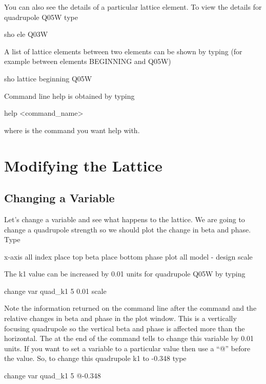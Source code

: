 You can also see the details of a particular lattice element. To view the details
for quadrupole Q05W type
\begin{example}
  sho ele Q03W
\end{example}

A list of lattice elements between two elements can be shown by typing (for
example between elements BEGINNING and Q05W)
\begin{example}
  sho lattice beginning Q05W
\end{example}

Command line help is obtained by typing
\begin{example}
  help <command\_name>
\end{example}
where  is the command you want help with.

\section{Modifying the Lattice}
\label{s:modify_lattice}

\subsection{Changing a Variable}
\label{ss:put_it_back}

Let's change a variable and see what happens to the lattice. We are going to
change a quadrupole strength so we should plot the change in beta and phase.
Type
\begin{example}
  x-axis all index
  place top beta
  place bottom phase
  plot all model - design
  scale
\end{example}

The k1 value can be increased by 0.01 units for quadrupole Q05W by typing
\begin{example}
  change var quad\_k1 5 0.01
  scale
\end{example}
Note the information returned on the command line after the command and the relative changes in
beta and phase in the plot window. This is a vertically focusing quadrupole so
the vertical beta and phase is affected more than the horizontal. The 
at the end of the command tells \tao to change this variable by 0.01 units. If
you want to set a variable to a particular value then use a ``@'' before the
value. So, to change this quadrupole k1 to -0.348 type
\begin{example}
  change var quad\_k1 5 @-0.348
\end{example}

